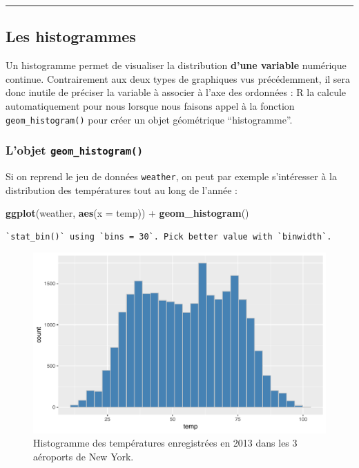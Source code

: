 \documentclass[
  a4paper,
]{article}
\newenvironment{Shaded}{\begin{snugshade}}{\end{snugshade}}
\newcommand{\DataTypeTok}[1]{\textcolor[rgb]{0.00,0.34,0.68}{#1}}
\newcommand{\KeywordTok}[1]{\textcolor[rgb]{0.12,0.11,0.11}{\textbf{#1}}}
\newcommand{\NormalTok}[1]{\textcolor[rgb]{0.12,0.11,0.11}{#1}}
\newcommand{\OperatorTok}[1]{\textcolor[rgb]{0.12,0.11,0.11}{#1}}
\newcommand{\StringTok}[1]{\textcolor[rgb]{0.75,0.01,0.01}{#1}}
\begin{document}
\begin{center}\rule{0.5\linewidth}{0.5pt}\end{center}

\hypertarget{histogram}{%
\subsection{Les histogrammes}\label{histogram}}

Un histogramme permet de visualiser la distribution \textbf{d'une variable} numérique continue. Contrairement aux deux types de graphiques vus précédemment, il sera donc inutile de préciser la variable à associer à l'axe des ordonnées : R la calcule automatiquement pour nous lorsque nous faisons appel à la fonction \texttt{geom\_histogram()} pour créer un objet géométrique ``histogramme''.

\hypertarget{lobjet-geom_histogram}{%
\subsubsection{\texorpdfstring{L'objet \texttt{geom\_histogram()}}{L'objet geom\_histogram()}}\label{lobjet-geom_histogram}}

Si on reprend le jeu de données \texttt{weather}, on peut par exemple s'intéresser à la distribution des températures tout au long de l'année :

\begin{Shaded}
\begin{Highlighting}[]
\KeywordTok{ggplot}\NormalTok{(weather, }\KeywordTok{aes}\NormalTok{(}\DataTypeTok{x =}\NormalTok{ temp)) }\OperatorTok{+}
\StringTok{  }\KeywordTok{geom_histogram}\NormalTok{()}
\end{Highlighting}
\end{Shaded}

\begin{verbatim}
`stat_bin()` using `bins = 30`. Pick better value with `binwidth`.
\end{verbatim}

\begin{figure}[htpb]

{\centering \includegraphics[width=0.9\linewidth]{figure/unnamed-chunk-47-1} 

}

\caption{Histogramme des températures enregistrées en 2013 dans les 3 aéroports de New York.}\label{fig:unnamed-chunk-47}
\end{figure}
\end{document}

